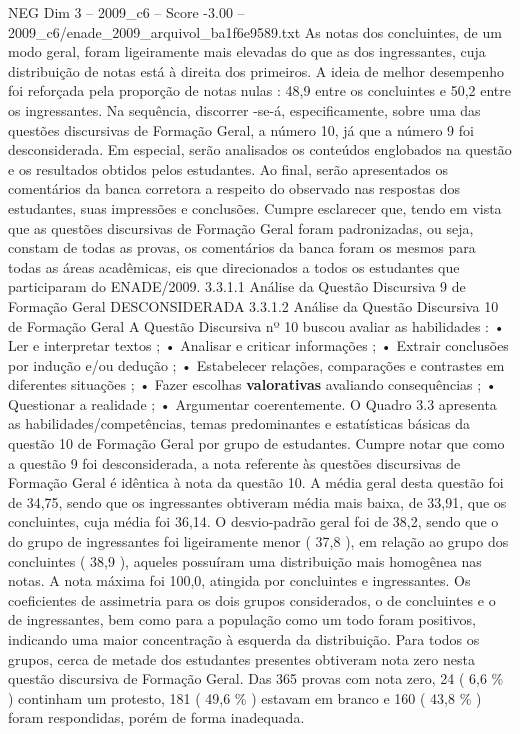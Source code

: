 \begin{textsample}{NEG Dim 3 – 2009\_c6 – Score -3.00 – 2009\_c6/enade\_2009\_arquivol\_ba1f6e9589.txt}
As notas dos concluintes, de um modo geral, foram ligeiramente mais elevadas do que as dos ingressantes, cuja distribuição de notas está à direita dos primeiros.
A ideia de melhor desempenho foi reforçada pela proporção de notas nulas : 48,9 entre os concluintes e 50,2 entre os ingressantes.
Na sequência, discorrer -se-á, especificamente, sobre uma das questões discursivas de Formação Geral, a número 10, já que a número 9 foi desconsiderada.
Em especial, serão analisados os conteúdos englobados na questão e os resultados obtidos pelos estudantes.
Ao final, serão apresentados os comentários da banca corretora a respeito do observado nas respostas dos estudantes, suas impressões e conclusões.
Cumpre esclarecer que, tendo em vista que as questões discursivas de Formação Geral foram padronizadas, ou seja, constam de todas as provas, os comentários da banca foram os mesmos para todas as áreas acadêmicas, eis que direcionados a todos os estudantes que participaram do ENADE/2009. 3.3.1.1 Análise da Questão Discursiva 9 de Formação Geral DESCONSIDERADA 3.3.1.2 Análise da Questão Discursiva 10 de Formação Geral A Questão Discursiva nº 10 buscou avaliar as habilidades : • Ler e interpretar textos ; • Analisar e criticar informações ; • Extrair conclusões por indução e/ou dedução ; • Estabelecer relações, comparações e contrastes em diferentes situações ; • Fazer escolhas \textbf{valorativas} avaliando consequências ; • Questionar a realidade ; • Argumentar coerentemente.
O Quadro 3.3 apresenta as habilidades/competências, temas predominantes e estatísticas básicas da questão 10 de Formação Geral por grupo de estudantes.
Cumpre notar que como a questão 9 foi desconsiderada, a nota referente às questões discursivas de Formação Geral é idêntica à nota da questão 10.
A média geral desta questão foi de 34,75, sendo que os ingressantes obtiveram média mais baixa, de 33,91, que os concluintes, cuja média foi 36,14.
O desvio-padrão geral foi de 38,2, sendo que o do grupo de ingressantes foi ligeiramente menor ( 37,8 ), em relação ao grupo dos concluintes ( 38,9 ), aqueles possuíram uma distribuição mais homogênea nas notas.
A nota máxima foi 100,0, atingida por concluintes e ingressantes.
Os coeficientes de assimetria para os dois grupos considerados, o de concluintes e o de ingressantes, bem como para a população como um todo foram positivos, indicando uma maior concentração à esquerda da distribuição.
Para todos os grupos, cerca de metade dos estudantes presentes obtiveram nota zero nesta questão discursiva de Formação Geral.
Das 365 provas com nota zero, 24 ( 6,6 \% ) continham um protesto, 181 ( 49,6 \% ) estavam em branco e 160 ( 43,8 \% ) foram respondidas, porém de forma inadequada.

\end{textsample}
